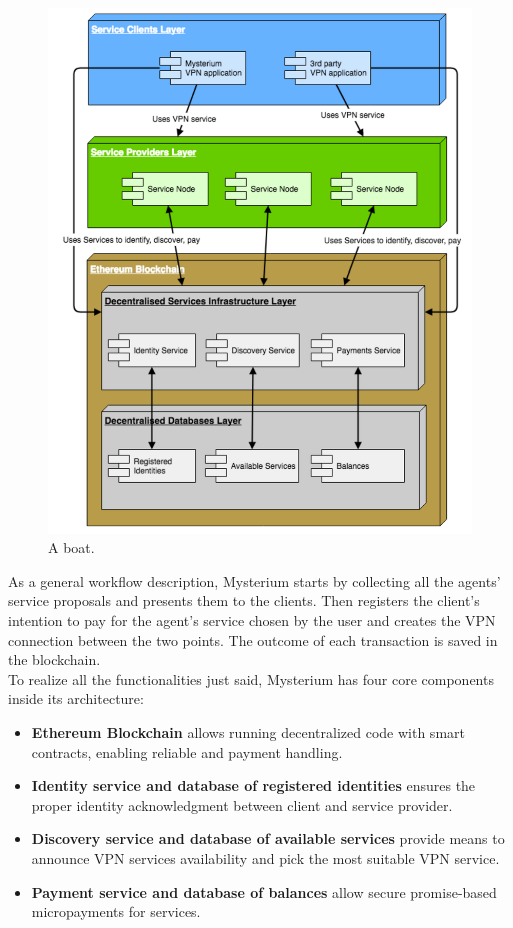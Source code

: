 \documentclass[]{article}
\begin{document}
	\begin{figure}
		\includegraphics[width=0.5\linewidth]{"images/mysterium_architecture.png"}
		\caption{A boat.}
		\label{fig:boat1}
	\end{figure}

	As a general workflow description, Mysterium starts by collecting all the agents' service proposals and presents them to the clients. Then registers the client's intention to pay for the agent's service chosen by the user and creates the VPN connection between the two points. The outcome of each transaction is saved in the blockchain.\\
	
	To realize all the functionalities just said, Mysterium has four core components inside its architecture:
	\begin{itemize}
		\item \textbf{Ethereum Blockchain} allows running decentralized code with smart contracts, enabling reliable and payment handling.
		\item \textbf{Identity service and database of registered identities} ensures the proper identity acknowledgment between client and service provider.
		\item \textbf{Discovery service and database of available services} provide means to announce VPN services availability and pick the most suitable VPN service.
		\item \textbf{Payment service and database of balances} allow secure promise-based micropayments for services.
	\end{itemize}
\end{document}
